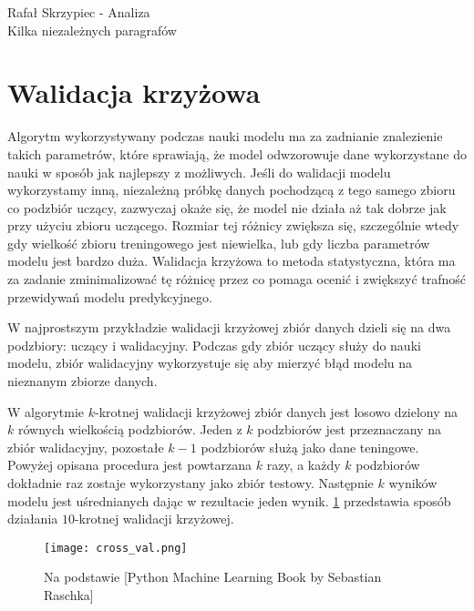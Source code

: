 \documentclass[]{article}
\author{Rafa\l \vspace{1cm} Skrzypiec}
\theoremstyle{definition}
\begin{document}

{\large Rafał Skrzypiec - Analiza}\\
Kilka niezależnych paragrafów
\vspace{1cm}

\section{Walidacja krzyżowa}

Algorytm wykorzystywany podczas nauki modelu ma za zadnianie znalezienie takich parametrów, które sprawiają, że model odwzorowuje dane wykorzystane do nauki w sposób jak najlepszy z możliwych. Jeśli do walidacji modelu wykorzystamy inną, niezależną próbkę danych pochodzącą z tego samego zbioru co podzbiór uczący, zazwyczaj okaże się, że model nie działa aż tak dobrze jak przy użyciu zbioru uczącego. Rozmiar tej różnicy zwiększa się, szczególnie wtedy gdy wielkość zbioru treningowego jest niewielka, lub gdy liczba parametrów modelu jest bardzo duża.
Walidacja krzyżowa to metoda statystyczna, która ma za zadanie zminimalizować tę różnicę przez co pomaga ocenić i zwiększyć trafność przewidywań modelu predykcyjnego. 


W najprostszym przykładzie walidacji krzyżowej zbiór danych dzieli się na dwa podzbiory: uczący i walidacyjny. Podczas gdy zbiór uczący służy do nauki modelu, zbiór walidacyjny wykorzystuje się aby mierzyć błąd modelu na nieznanym zbiorze danych. 
		
W algorytmie $k$-krotnej walidacji krzyżowej zbiór danych jest losowo dzielony na $k$ równych wielkością podzbiorów. Jeden z $k$ podzbiorów jest przeznaczany na zbiór walidacyjny, pozostałe $k-1$ podzbiorów służą jako dane teningowe. Powyżej opisana procedura jest powtarzana $k$ razy, a każdy $k$ podzbiorów dokładnie raz zostaje wykorzystany jako zbiór testowy. Następnie $k$ wyników modelu jest uśrednianych dając w rezultacie jeden wynik. \figurename{} \ref{fig:cross-val} przedstawia sposób działania $10$-krotnej walidacji krzyżowej.

	\begin{figure}[htp!]
		\centering
		\texttt{[image: cross\_val.png]}
		\caption{Na podstawie [Python Machine Learning
			Book by Sebastian Raschka]}
		\label{fig:cross-val}
	\end{figure}
\end{document}
